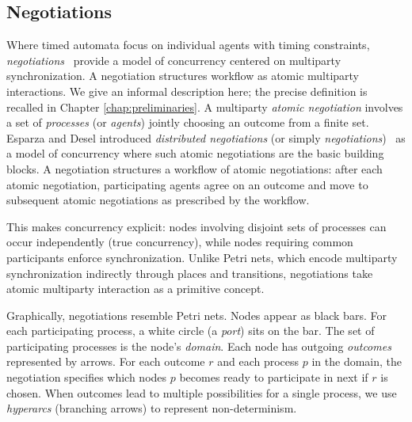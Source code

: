 \subsection{Negotiations}
\label{subsubsec:negotiations}

Where timed automata focus on individual agents with timing constraints, \emph{negotiations}~\cite{EsparzaDeselNegotiations} provide a model of concurrency centered on multiparty synchronization. A negotiation structures workflow as atomic multiparty interactions. We give an informal description here; the precise definition is recalled in Chapter \ref{chap:preliminaries}. A multiparty \emph{atomic negotiation} involves a set of \emph{processes} (or \emph{agents}) jointly choosing an outcome from a finite set. Esparza and Desel introduced \emph{distributed negotiations} (or simply \emph{negotiations})~\cite{EsparzaDeselNegotiations} as a model of concurrency where such atomic negotiations are the basic building blocks. A negotiation structures a workflow of atomic negotiations: after each atomic negotiation, participating agents agree on an outcome and move to subsequent atomic negotiations as prescribed by the workflow.

This makes concurrency explicit: nodes involving disjoint sets of processes can occur independently (true concurrency), while nodes requiring common participants enforce synchronization. Unlike Petri nets, which encode multiparty synchronization indirectly through places and transitions, negotiations take atomic multiparty interaction as a primitive concept.

Graphically, negotiations resemble Petri nets. Nodes appear as black bars. For each participating process, a white circle (a \emph{port}) sits on the bar. The set of participating processes is the node's \emph{domain}. Each node has outgoing \emph{outcomes} represented by arrows. For each outcome $r$ and each process $p$ in the domain, the negotiation specifies which nodes $p$ becomes ready to participate in next if $r$ is chosen. When outcomes lead to multiple possibilities for a single process, we use \emph{hyperarcs} (branching arrows) to represent non-determinism.

